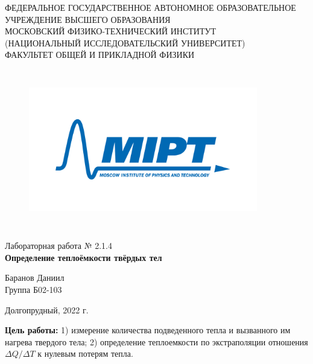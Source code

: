\documentclass[a4paper,12pt]{article} %
\begin{document}
\begin{center}
	\footnotesize{ФЕДЕРАЛЬНОЕ ГОСУДАРСТВЕННОЕ АВТОНОМНОЕ ОБРАЗОВАТЕЛЬНОЕ 			УЧРЕЖДЕНИЕ ВЫСШЕГО ОБРАЗОВАНИЯ}\\
	\footnotesize{МОСКОВСКИЙ ФИЗИКО-ТЕХНИЧЕСКИЙ ИНСТИТУТ\\(НАЦИОНАЛЬНЫЙ 			ИССЛЕДОВАТЕЛЬСКИЙ УНИВЕРСИТЕТ)}\\
	\footnotesize{ФАКУЛЬТЕТ ОБЩЕЙ И ПРИКЛАДНОЙ ФИЗИКИ\\}
	\hfill \break
	\hfill \break
	\hfill \break
	\hfill \break
\end{center}


\begin{figure}[h]
    \centering
    \includegraphics*[width=10cm,height=7cm,keepaspectratio]{mipt_eng_text_png.png}
    \label{fig:my_label}
\end{figure}


\begin{center}   
    \hfill \break
	\hfill \break
	\hfill \break
	\hfill \break
	\large{Лабораторная работа № 2.1.4\\\textbf{Определение теплоёмкости твёрдых тел}}\\
	\hfill \break
	\hfill \break
	\hfill \break
	\hfill \break
	\begin{flushright}
		Баранов Даниил\\
		Группа Б02-103
	\end{flushright}
	\hfill \break
	\hfill \break
	\hfill \break
\end{center}
\hfill \break
\hfill \break
\hfill \break
\hfill \break
\begin{center}
	Долгопрудный, 2022 г.
\end{center}
\thispagestyle{empty}



\newpage

\textbf{Цель работы:} 1) измерение количества подведенного тепла и вызванного им нагрева твердого тела; 2) определение теплоемкости по экстраполяции отношения $\Delta Q / \Delta T$ к нулевым потерям тепла.\hfill
\break
	
\end{document}
